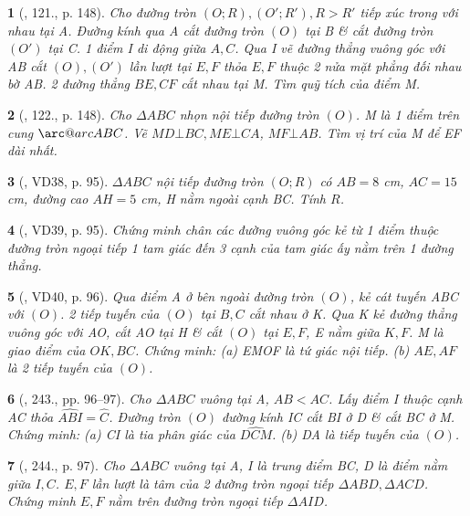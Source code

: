 \documentclass{article}
\makeatletter
\newcommand{\arc@char}{{\usefont{U}{tipa}{m}{n}\symbol{62}}}%
\newcommand{\arc}[1]{\mathpalette\arc@arc{#1}}
\newcommand{\arc@arc}[2]{%
	\sbox0{$\m@th#1#2$}%
	\vbox{
		\hbox{\resizebox{\wd0}{\height}{\arc@char}}
		\nointerlineskip
		\box0
	}%
}
\newtheorem{baitoan}{}
\makeatother
\begin{document}
\begin{baitoan}[\cite{Tuyen_Toan_9_old}, 121., p. 148]
	Cho đường tròn $(O;R),(O';R'),R > R'$ tiếp xúc trong với nhau tại A. Đường kính qua A cắt đường tròn $(O)$ tại B \& cắt đường tròn $(O')$ tại C. 1 điểm I di động giữa $A,C$. Qua I vẽ đường thẳng vuông góc với AB cắt $(O),(O')$ lần lượt tại $E,F$ thỏa $E,F$ thuộc 2 nửa mặt phẳng đối nhau bờ AB. 2 đường thẳng $BE,CF$ cắt nhau tại M. Tìm quỹ tích của điểm M.
\end{baitoan}

\begin{baitoan}[\cite{Tuyen_Toan_9_old}, 122., p. 148]
	Cho $\Delta ABC$ nhọn nội tiếp đường tròn $(O)$. M là 1 điểm trên cung $\arc{ABC}$. Vẽ $MD\bot BC,ME\bot CA$, $MF\bot AB$. Tìm vị trí của M để EF dài nhất. 
\end{baitoan}

\begin{baitoan}[\cite{Binh_Toan_9_tap_2}, VD38, p. 95]
	$\Delta ABC$ nội tiếp đường tròn $(O;R)$ có $AB = 8$ {\rm cm}, $AC = 15$ {\rm cm}, đường cao $AH = 5$ {\rm cm}, H nằm ngoài cạnh BC. Tính $R$.
\end{baitoan}

\begin{baitoan}[\cite{Binh_Toan_9_tap_2}, VD39, p. 95]
	Chứng minh chân các đường vuông góc kẻ từ 1 điểm thuộc đường tròn ngoại tiếp 1 tam giác đến 3 cạnh của tam giác ấy nằm trên 1 đường thẳng.
\end{baitoan}

\begin{baitoan}[\cite{Binh_Toan_9_tap_2}, VD40, p. 96]
	Qua điểm A ở bên ngoài đường tròn $(O)$, kẻ cát tuyến ABC với $(O)$. 2 tiếp tuyến của $(O)$ tại $B,C$ cắt nhau ở K. Qua K kẻ đường thẳng vuông góc với AO, cắt AO tại H \& cắt $(O)$ tại $E,F$, E nằm giữa $K,F$. M là giao điểm của $OK,BC$. Chứng minh: (a) EMOF là tứ giác nội tiếp. (b) $AE,AF$ là 2 tiếp tuyến của $(O)$.
\end{baitoan}

\begin{baitoan}[\cite{Binh_Toan_9_tap_2}, 243., pp. 96--97]
	Cho $\Delta ABC$ vuông tại A, $AB < AC$. Lấy điểm I thuộc cạnh AC thỏa $\widehat{ABI} = \widehat{C}$. Đường tròn $(O)$ đường kính IC cắt BI ở D \& cắt BC ở M. Chứng minh: (a) CI là tia phân giác của $\widehat{DCM}$. (b) DA là tiếp tuyến của $(O)$.
\end{baitoan}

\begin{baitoan}[\cite{Binh_Toan_9_tap_2}, 244., p. 97]
	Cho $\Delta ABC$ vuông tại A, I là trung điểm BC, D là điểm nằm giữa $I,C$. $E,F$ lần lượt là tâm của 2 đường tròn ngoại tiếp $\Delta ABD,\Delta ACD$. Chứng minh $E,F$ nằm trên đường tròn ngoại tiếp $\Delta AID$.
\end{baitoan}
\end{document}
